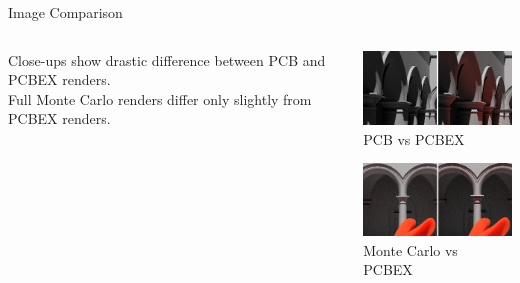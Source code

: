 \documentclass[10pt,compress,professionalfont]{beamer}
\begin{document}
\begin{frame}{Image Comparison}


    \begin{columns}
        \begin{column}{0.5\textwidth}
            Close-ups show drastic difference between PCB and PCBEX renders.\\
            \vspace{8mm}
            Full Monte Carlo renders differ only slightly from PCBEX renders.
        \end{column}
        \begin{column}{0.5\textwidth}

            {\centering
            \includegraphics[width=50mm]{../img/compare_trad_corrected}\\
            {\centering\scriptsize PCB vs PCBEX\\}
            
            \vspace{5mm}

            \includegraphics[width=50mm]{../img/compare1_corrected}\\
            {\centering\scriptsize Monte Carlo vs PCBEX\\}
            }
        \end{column}
    \end{columns}


\end{frame}
\end{document}
